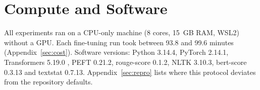 \section{Compute and Software}

All experiments ran on a CPU-only machine (8 cores, 15~GB RAM, WSL2) without a GPU. Each fine-tuning run took between 93.8 and 99.6 minutes (Appendix~\ref{sec:cost}). Software versions: Python 3.14.4, PyTorch 2.14.1, Transformers 5.19.0 \parencite{wolf2020transformers}, PEFT 0.21.2, rouge-score 0.1.2, NLTK 3.10.3, bert-score 0.3.13 and textstat 0.7.13. Appendix~\ref{sec:repro} lists where this protocol deviates from the repository defaults.
